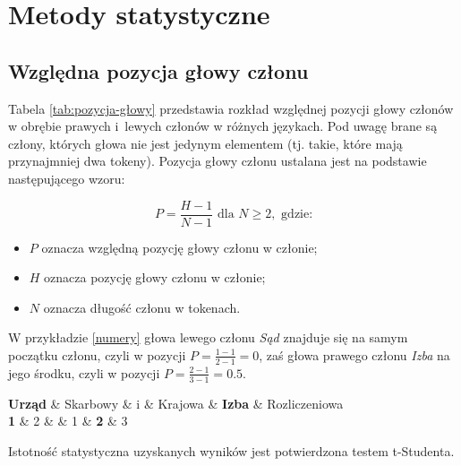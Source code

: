 \chapter{Metody statystyczne} \label{ch5}

\section{Względna pozycja głowy członu}



Tabela \ref{tab:pozycja-głowy} przedstawia rozkład względnej pozycji głowy członów w obrębie prawych i~lewych członów w różnych językach. Pod uwagę brane są człony, których głowa nie jest jedynym elementem (tj. takie, które mają przynajmniej dwa tokeny). Pozycja głowy członu ustalana jest na podstawie następującego wzoru:

\[
P = \frac{H-1}{N-1} \text{ dla } N\geq2, \text{ gdzie:}
\]

\begin{itemize}
\item $P$ oznacza względną pozycję głowy członu w członie;
\item $H$ oznacza pozycję głowy członu w członie;
\item $N$ oznacza długość członu w tokenach.
\end{itemize}

W przykładzie \eqref{numery} głowa lewego członu \textit{Sąd} znajduje się na samym początku członu, czyli w pozycji $P=\frac{1-1}{2-1}=0$, zaś głowa prawego członu \textit{Izba} na jego środku, czyli w pozycji $P=\frac{2-1}{3-1}=0.5$.

\begin{exe}
\ex \label{numery}
\begin{dependency}[theme=simple, baseline=-\the\dimexpr\fontdimen22\textfont2\relax]
\begin{deptext}
\textbf{Urząd} \& Skarbowy \& i \& Krajowa \& \textbf{Izba} \&  Rozliczeniowa \\
\scriptsize \textbf{1} \& \scriptsize 2 \&   \& \scriptsize 1 \& \scriptsize \textbf{2} \& \scriptsize 3 \\
\end{deptext}
\end{dependency}
\end{exe}

Istotność statystyczna uzyskanych wyników jest potwierdzona testem t-Studenta.

